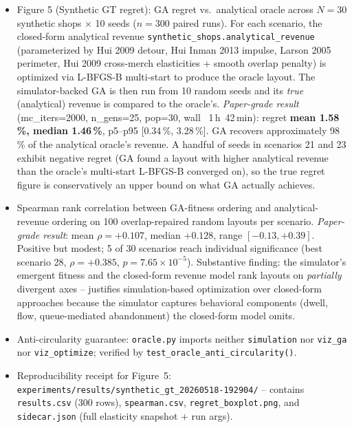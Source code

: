 \documentclass[11pt]{article}
\begin{document}
\begin{itemize}[leftmargin=*]
  \item Figure 5 (Synthetic GT regret): GA regret vs.\ analytical
    oracle across $N{=}30$ synthetic shops $\times$ 10 seeds
    ($n{=}300$ paired runs). For each scenario, the closed-form
    analytical revenue \texttt{synthetic\_shops.analytical\_revenue}
    (parameterized by Hui 2009 detour, Hui Inman 2013 impulse,
    Larson 2005 perimeter, Hui 2009 cross-merch elasticities + smooth
    overlap penalty) is optimized via L-BFGS-B multi-start to produce
    the oracle layout. The simulator-backed GA is then run from 10
    random seeds and its \emph{true} (analytical) revenue is compared
    to the oracle's.
    \emph{Paper-grade result} (mc\_iters=2000, n\_gens=25, pop=30,
    wall ~1\,h~42\,min): regret \textbf{mean 1.58\,\%, median
    1.46\,\%}, p5--p95 [0.34\,\%, 3.28\,\%]. GA recovers approximately
    98\,\% of the analytical oracle's revenue. A handful of seeds in
    scenarios 21 and 23 exhibit negative regret (GA found a layout
    with higher analytical revenue than the oracle's multi-start
    L-BFGS-B converged on), so the true regret figure is conservatively
    an upper bound on what GA actually achieves.
  \item Spearman rank correlation between GA-fitness ordering and
    analytical-revenue ordering on 100 overlap-repaired random
    layouts per scenario. \emph{Paper-grade result}: mean
    $\rho={+}0.107$, median ${+}0.128$, range $[{-}0.13, {+}0.39]$.
    Positive but modest; 5 of 30 scenarios reach individual
    significance (best scenario 28, $\rho={+}0.385$, $p{=}7.65{\times}10^{-5}$).
    Substantive finding: the simulator's emergent fitness and the
    closed-form revenue model rank layouts on \emph{partially}
    divergent axes -- justifies simulation-based optimization over
    closed-form approaches because the simulator captures behavioral
    components (dwell, flow, queue-mediated abandonment) the
    closed-form model omits.
  \item Anti-circularity guarantee: \texttt{oracle.py} imports
    neither \texttt{simulation} nor \texttt{viz\_ga} nor
    \texttt{viz\_optimize}; verified by
    \texttt{test\_oracle\_anti\_circularity()}.
  \item Reproducibility receipt for Figure~5:
    \texttt{experiments/results/synthetic\_gt\_20260518-192904/} --
    contains \texttt{results.csv} (300 rows),
    \texttt{spearman.csv}, \texttt{regret\_boxplot.png}, and
    \texttt{sidecar.json} (full elasticity snapshot + run args).
\end{itemize}
\end{document}
